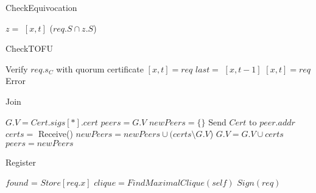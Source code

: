 \begin{algorithm}
\label{CheckEquivocation}
  \caption{CheckEquivocation}
  $z = $ \Storage$[x, t]$\;
  {
    \Revoke($req.S \cap z.S$)\;
  }
\end{algorithm}

\begin{algorithm}
\label{CheckTOFU}
  \caption{CheckTOFU}
  Verify $req.s_C$ with quorum certificate\;
  \eIf{\Storage$[x, 0] = \bot$}
  {
    \Storage$[x, t] = req$\;
  }{
    $last = $ \Storage$[x, t-1]$\;
    {
      \Storage$[x, t] = req$\;
    }{
      Error\;
    }
  }
\end{algorithm}

\ifdefined\ABSTRACT
\else

\begin{algorithm}
\label{Join}
  \caption{Join}
  $G.V = Cert.sigs[*].cert$\;
  $peers = G.V$\;
  {
    $newPeers = \{\}$\;
    {
      Send $Cert$ to $peer.addr$\;
      $certs = $ Receive()\;
      $newPeers = newPeers \cup (certs \setminus G.V$)\;
      $G.V = G.V \cup certs$\;
    }
    $peers = newPeers$\;
  }
\end{algorithm}

\begin{algorithm}
\label{Register}
  \caption{Register}
  $found$ = $Store[req.x]$\;
  {
    $clique = FindMaximalClique(self)$\;
    {
      $Sign(req)$\;
    }
  }
\end{algorithm}

\fi
